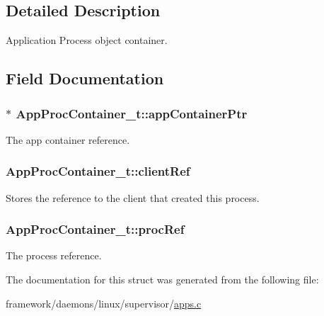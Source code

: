 \subsection{Detailed Description}
Application Process object container. 

\subsection{Field Documentation}
\subsubsection[{\texorpdfstring{app\+Container\+Ptr}{appContainerPtr}}]{$\ast$ App\+Proc\+Container\+\_\+t\+::app\+Container\+Ptr}\hypertarget{struct_app_proc_container__t_a3aef8dbbccb8e4352912d04abd3c9aca}{}\label{struct_app_proc_container__t_a3aef8dbbccb8e4352912d04abd3c9aca}


The app container reference. 

\subsubsection[{\texorpdfstring{client\+Ref}{clientRef}}]{ App\+Proc\+Container\+\_\+t\+::client\+Ref}\hypertarget{struct_app_proc_container__t_ae2431e4d6c88320d84a97381eefb1e92}{}\label{struct_app_proc_container__t_ae2431e4d6c88320d84a97381eefb1e92}
Stores the reference to the client that created this process. 
\subsubsection[{\texorpdfstring{proc\+Ref}{procRef}}]{ App\+Proc\+Container\+\_\+t\+::proc\+Ref}\hypertarget{struct_app_proc_container__t_a8193c3b01f80cbfb0585ee192e08d82b}{}\label{struct_app_proc_container__t_a8193c3b01f80cbfb0585ee192e08d82b}


The process reference. 



The documentation for this struct was generated from the following file\+:\begin{DoxyCompactItemize}
\item 
framework/daemons/linux/supervisor/\hyperlink{apps_8c}{apps.\+c}\end{DoxyCompactItemize}
